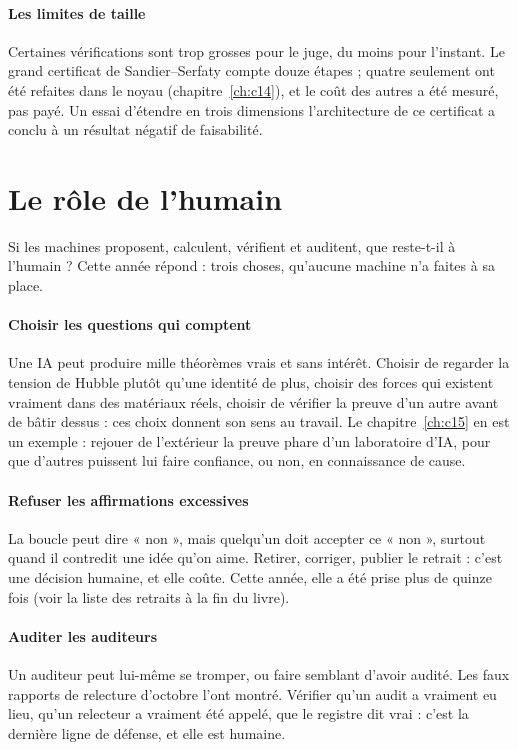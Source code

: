 \paragraph{Les limites de taille} Certaines vérifications sont trop grosses pour le juge, du moins pour l'instant. Le
grand certificat de Sandier--Serfaty compte douze étapes ; quatre seulement ont été refaites dans le noyau
(chapitre~\ref{ch:c14}), et le coût des autres a été mesuré, pas payé. Un essai d'étendre en trois dimensions
l'architecture de ce certificat a conclu à un résultat négatif de faisabilité.

\section{Le rôle de l'humain}

Si les machines proposent, calculent, vérifient et auditent, que reste-t-il à l'humain ? Cette année répond : trois
choses, qu'aucune machine n'a faites à sa place.

\paragraph{Choisir les questions qui comptent} Une IA peut produire mille théorèmes vrais et sans intérêt. Choisir de
regarder la tension de Hubble plutôt qu'une identité de plus, choisir des forces qui existent vraiment dans des
matériaux réels, choisir de vérifier la preuve d'un autre avant de bâtir dessus : ces choix donnent son sens au
travail. Le chapitre~\ref{ch:c15} en est un exemple : rejouer de l'extérieur la preuve phare d'un laboratoire d'IA,
pour que d'autres puissent lui faire confiance, ou non, en connaissance de cause.

\paragraph{Refuser les affirmations excessives} La boucle peut dire « non », mais quelqu'un doit accepter ce « non »,
surtout quand il contredit une idée qu'on aime. Retirer, corriger, publier le retrait : c'est une décision humaine, et
elle coûte. Cette année, elle a été prise plus de quinze fois (voir la liste des retraits à la fin du livre).

\paragraph{Auditer les auditeurs} Un auditeur peut lui-même se tromper, ou faire semblant d'avoir audité. Les faux
rapports de relecture d'octobre l'ont montré. Vérifier qu'un audit a vraiment eu lieu, qu'un relecteur a vraiment été
appelé, que le registre dit vrai : c'est la dernière ligne de défense, et elle est humaine.

